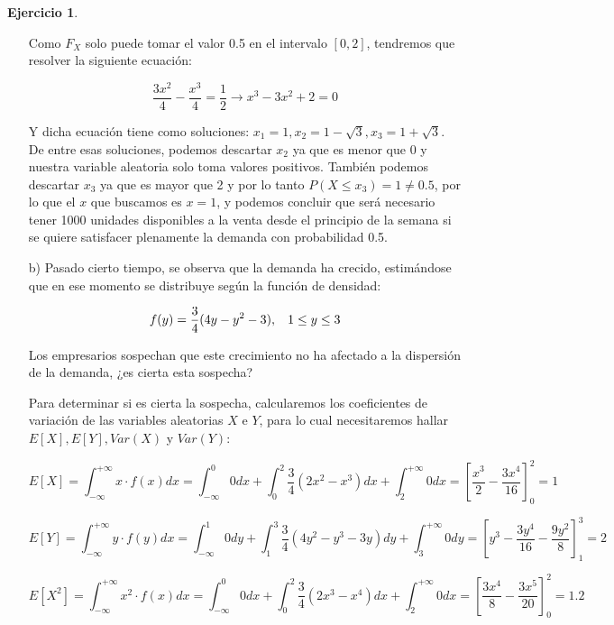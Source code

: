 \documentclass[a4paper, 12pt]{article}
\theoremstyle{definition}
\newtheorem{ej}{Ejercicio}
\begin{document}
\begin{ej}
\begin{enumerate}
    Como $F_{X}$ solo puede tomar el valor 0.5 en el intervalo $[0,2]$, tendremos que resolver la siguiente ecuación:
    
    \[
    \frac{3x^2}{4}-\frac{x^3}{4} = \frac{1}{2} \rightarrow x^3-3x^2+2=0
    \]
    
    Y dicha ecuación tiene como soluciones: $x_1 = 1, x_2 = 1-\sqrt{3}, x_3 = 1+ \sqrt{3}$. De entre esas soluciones, podemos descartar $x_2$ ya que es menor que 0 y nuestra variable aleatoria solo toma valores positivos. También podemos descartar $x_3$ ya que es mayor que 2 y por lo tanto $P(X\leq x_3) = 1 \neq 0.5$, por lo que el $x$ que buscamos es $x = 1$, y podemos concluir que será necesario tener 1000 unidades disponibles a la venta desde el principio de la semana si se quiere satisfacer plenamente la demanda con probabilidad 0.5.

    \item[b)] Pasado cierto tiempo, se observa que la demanda ha crecido, estimándose que en ese momento se distribuye según la función de densidad:
    
    \[
    f(y)=\frac{3}{4} (4y-y^2-3), \hspace{0.3cm} 1 \leq y \leq 3
    \]
    
    Los empresarios sospechan que este crecimiento no ha afectado a la dispersión de la demanda, ¿es cierta esta sospecha?
    
    Para determinar si es cierta la sospecha, calcularemos los coeficientes de variación de las variables aleatorias $X$ e $Y$, para lo cual necesitaremos hallar $E[X], E[Y], Var(X)$ y $Var(Y)$:
    
    \begin{equation*}
        E[X] = \int_{-\infty}^{+\infty}x \cdot f(x)dx = \int_{-\infty}^{0}0dx + \int_{0}^{2}\frac{3}{4} (2x^2-x^3)dx + \int_{2}^{+\infty}0dx = \left[\frac{x^3}{2}-\frac{3x^4}{16}\right]^{2}_{0} = 1
    \end{equation*}
    
    \begin{equation*}
        E[Y] = \int_{-\infty}^{+\infty}y \cdot f(y)dx = \int_{-\infty}^{1}0dy + \int_{1}^{3}\frac{3}{4} (4y^2-y^3-3y)dy + \int_{3}^{+\infty}0dy = \left[y^3-\frac{3y^4}{16}-\frac{9y^2}{8}\right]^{3}_{1} = 2
    \end{equation*}
    
    \begin{equation*}
        E[X^2] = \int_{-\infty}^{+\infty}x^2 \cdot f(x)dx = \int_{-\infty}^{0}0dx + \int_{0}^{2}\frac{3}{4} (2x^3-x^4)dx + \int_{2}^{+\infty}0dx = \left[\frac{3x^4}{8}-\frac{3x^5}{20}\right]^{2}_{0} = 1.2
    \end{equation*}
    

\end{enumerate}
\end{ej}
\end{document}
